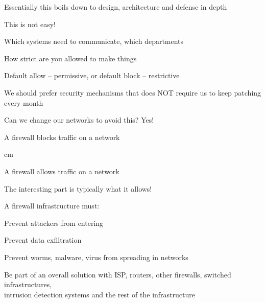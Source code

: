 \documentclass[Screen16to9,17pt]{foils}
\begin{document}
Essentially this boils down to design, architecture and defense in depth



\begin{quote}

\end{quote}

This is not easy!
\begin{list2}
\item Which systems need to communicate, which departments
\item How strict are you allowed to make things
\item Default allow -- permissive, or default block -- restrictive
\end{list2}




\begin{list2}
\item We should prefer security mechanisms that does NOT require us to keep patching every month
\item Can we change our networks to avoid this? Yes!
\end{list2}







\centerline{\hlkbig A firewall {\color{security6blue}blocks traffic} on a network}

 cm
\pause

\centerline{\hlkbig A firewall {\color{red}allows traffic} on a network}
{\small The interesting part is typically what it allows!}

\begin{list1}
\item A firewall infrastructure must:
\begin{list2}
\item Prevent attackers from entering
\item Prevent data exfiltration
\item Prevent worms, malware, virus from spreading in networks
\item Be part of an overall solution with ISP, routers, other firewalls, switched infrastructures,\\
  intrusion detection systems and the rest of the infrastructure
\end{list2}
\end{list1}
\end{document}
